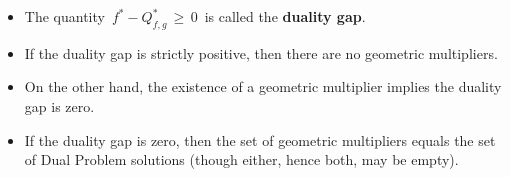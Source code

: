 \vskip 0.5cm
\begin{remark}
\mbox{}
\vskip 0.0cm
\begin{itemize}
\item
	The quantity \,$f^{*} - Q_{f,g}^{*}\,\geq\,0$\, is called the \textbf{duality gap}.
\item
	If the duality gap is strictly positive, then there are no geometric multipliers.
\item
	On the other hand, the existence of a geometric multiplier implies the duality gap is zero.
\item
	If the duality gap is zero, then the set of geometric multipliers equals the set of Dual Problem solutions
	(though either, hence both, may be empty).
\end{itemize}
\end{remark}

